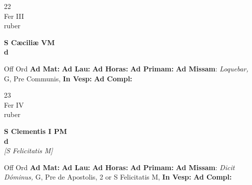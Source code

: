 \documentclass[10pt, openany]{book}
\begin{document}
    \begin{center}
        \begin{minipage}{3.5in}
            \vspace{2em}
            \begin{minipage}{0.5in}
                {\Huge 22} \\
                {\normalsize Fer III} \\
                {\normalsize ruber}
            \end{minipage}
            \begin{minipage}{3.0in}
                \textbf{ \large S Cæciliæ VM \\
                \textnormal{\normalsize d}} \\ 
            \end{minipage}
            \begin{justify}Off Ord
                \textbf{Ad Mat: }
                \textbf{Ad Lau: }
                \textbf{Ad Horas: }
                \textbf{Ad Primam: }\textbf{Ad Missam}: \textit{Loquebar,} G, Pre Communis,  
                \textbf{In Vesp: }
                \textbf{Ad Compl: }
            \end{justify}
        \end{minipage}
    \end{center}

    \begin{center}
        \begin{minipage}{3.5in}
            \vspace{2em}
            \begin{minipage}{0.5in}
                {\Huge 23} \\
                {\normalsize Fer IV} \\
                {\normalsize ruber}
            \end{minipage}
            \begin{minipage}{3.0in}
                \textbf{ \large S Clementis I PM \\
                \textnormal{\normalsize d}} \\ \textit{[S Felicitatis M]} \\ 
            \end{minipage}
            \begin{justify}Off Ord
                \textbf{Ad Mat: }
                \textbf{Ad Lau: }
                \textbf{Ad Horas: }
                \textbf{Ad Primam: }\textbf{Ad Missam}: \textit{Dicit Dóminus,} G, Pre de Apostolis, 2 or S Felicitatis M,  
                \textbf{In Vesp: }
                \textbf{Ad Compl: }
            \end{justify}
        \end{minipage}
    \end{center}
\end{document}
